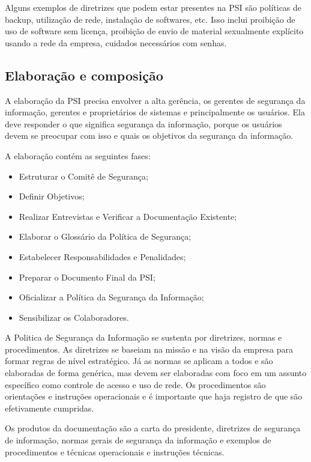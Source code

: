 \documentclass[12pt]{article}
\begin{document}
Alguns exemplos de diretrizes que podem estar presentes na PSI são políticas de backup, utilização de rede, instalação de softwares, etc.
Isso inclui proibição de uso de software sem licença, proibição de envio de material sexualmente explícito usando a rede da empresa, cuidados necessários com senhas.

\subsection{Elaboração e composição}

A elaboração da PSI precisa envolver a alta gerência, os gerentes de segurança da informação, gerentes e proprietários
de sistemas e principalmente os usuários. Ela deve responder o que significa segurança da informação,
porque os usuários devem se preocupar com isso e quais os objetivos da segurança da informação. 

A elaboração contém as seguintes fases:
\begin{itemize}
  \item Estruturar o Comitê de Segurança;
  \item Definir Objetivos;
  \item Realizar Entrevistas e Verificar a Documentação Existente;
  \item Elaborar o Glossário da Política de Segurança;
  \item Estabelecer Responsabilidades e Penalidades;
  \item Preparar o Documento Final da PSI;
  \item Oficializar a Política da Segurança da Informação;
  \item Sensibilizar os Colaboradores.
\end{itemize}

A Politica de Segurança da Informação se sustenta por diretrizes, normas e procedimentos.
As diretrizes se baseiam na missão e na visão da empresa para formar regras de nível estratégico.
Já as normas se aplicam a todos e são elaboradas de forma genérica, mas devem ser elaboradas com foco em um assunto específico como controle de acesso e uso de rede.
Os procedimentos são orientações e instruções operacionais e é importante que haja registro de que são efetivamente cumpridas.

Os produtos da documentação são a carta do presidente, diretrizes de segurança de informação,
normas gerais de segurança da informação e exemplos de procedimentos e técnicas operacionais e instruções técnicas.
\end{document}
